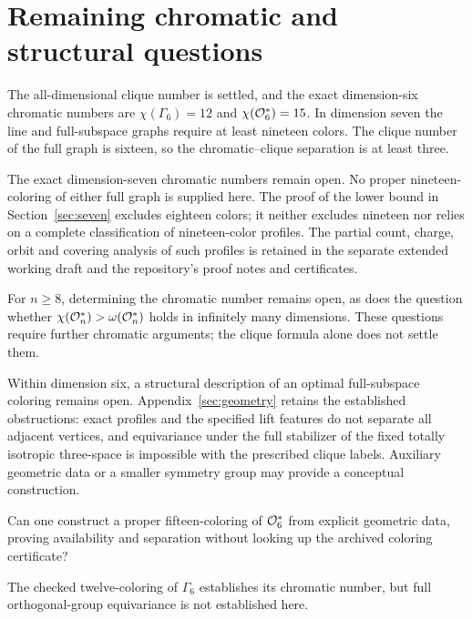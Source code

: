 \section{Remaining chromatic and structural questions}
\label{sec:higher}
The all-dimensional clique number is settled, and the exact dimension-six
chromatic numbers are $\chi(\Gamma_6)=12$ and $\chi(\mathcal O_6^*)=15$.
In dimension seven the line and full-subspace graphs require at least
nineteen colors. The clique number of the full graph is sixteen, so the
chromatic--clique separation is at least three.

The exact dimension-seven chromatic numbers remain open. No proper
nineteen-coloring of either full graph is supplied here. The proof of the
lower bound in Section~\ref{sec:seven} excludes eighteen colors; it neither
excludes nineteen nor relies on a complete classification of
nineteen-color profiles. The partial count, charge, orbit and covering
analysis of such profiles is retained in the separate extended working
draft and the repository's proof notes and certificates.

For $n\geq8$, determining the chromatic number remains open, as does the
question whether $\chi(\mathcal O_n^*)>\omega(\mathcal O_n^*)$ holds in infinitely many
dimensions. These questions require further chromatic arguments; the
clique formula alone does not settle them.

Within dimension six, a structural description of an optimal full-subspace
coloring remains open. Appendix~\ref{sec:geometry} retains the established
obstructions: exact profiles and the specified lift features do not
separate all adjacent vertices, and equivariance under the full
stabilizer of the fixed totally isotropic three-space is impossible with
the prescribed clique labels. Auxiliary geometric data or a smaller
symmetry group may provide a conceptual construction.

\begin{problem}\label{prob:structural}
Can one construct a proper fifteen-coloring of $\mathcal O_6^*$ from explicit
geometric data, proving availability and separation without looking up
the archived coloring certificate?
\end{problem}
The checked twelve-coloring of $\Gamma_6$ establishes its chromatic
number, but full orthogonal-group equivariance is not established here.
